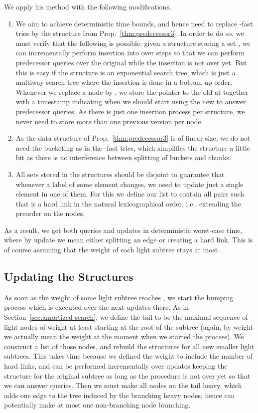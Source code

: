\documentclass[11pt,onecolumn,final]{article} \usepackage{a4}
\theoremstyle{plain}
\theoremstyle{remark}
\begin{document}
We apply his method with the following modifications.

\begin{enumerate}
\item We aim to achieve deterministic time bounds, and hence need to replace -fast tries by the structure from Prop.~\ref{thm:predecessor3}. In order to do so, we must verify that the following is possible: given a structure storing a set , we can incrementally perform insertion into  over  steps so that we can perform predecessor queries over the original  while the insertion is not over yet. But this is easy if the structure is an exponential search tree, which is just a multiway search tree where the insertion is done in a bottom-up order. Whenever we replace a node  by , we store the pointer to the old  at  together with a timestamp indicating when we should start using the new  to answer predecessor queries. As there is just one insertion process per structure, we never need to store more than one previous version per node.
\item As the data structure of Prop.~\ref{thm:predecessor3} is of linear size, we do not need the bucketing as in the -fast tries, which simplifies the structure a little bit as there is no interference between splitting of buckets and chunks.
\item All sets stored in the structures should be disjoint to guarantee that whenever a label of some element changes, we need to update just a single element in one of them. For this we define our list to contain all pairs  such that  is a hard link in the natural lexicographical order, i.e., extending the preorder on the nodes.
\end{enumerate}

As a result, we get both queries and updates in deterministic  worst-case time, where by update we mean either splitting an edge or creating a hard link. This is of course assuming that the weight of each light subtree stays at most . 

\subsection{Updating the Structures}
As soon as the weight of some light subtree reaches , we start the bumping process which is executed over the next  updates there. As in Section~\ref{sec:amortized search}, we define the tail to be the maximal sequence of light nodes of weight at least  starting at the root of the subtree (again, by weight we actually mean the weight at the moment when we started the process). We construct a list of those nodes, and rebuild the structures for all new smaller light subtrees. This takes  time because we defined the weight to include the number of hard links, and can be performed incrementally over  updates keeping the structure for the original subtree as long as the procedure is not over yet so that we can answer queries. Then we must make all nodes on the tail heavy, which adds one edge to the tree induced by the branching heavy nodes, hence can potentially make at most one non-branching node branching.
\end{document}
